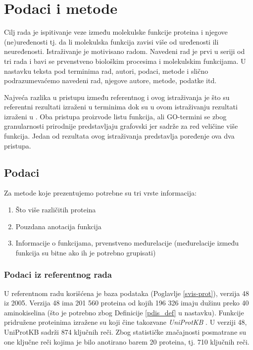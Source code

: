 
\chapter{Podaci i metode} %

\label{Podaci i metode} %

Cilj rada je ispitivanje veze između molekulske funkcije proteina i njegove\\ 
(ne)uređenosti tj. da li molekulska funkcija zavisi više od uređenosti ili
neuređenosti. Istraživanje je motivisano radom\parencite{Xie2007}. Navedeni rad
je prvi u seriji od tri rada i bavi se prvenstveno biološkim procesima i
molekulskim funkcijama.  U nastavku teksta pod terminima 
rad, autori, podaci, metode i slično podrazumevaćemo navedeni rad, njegove
autore, metode, podatke itd.

Najveća razlika u pristupu između referentnog i ovog istraživanja je što su
referentni rezultati izraženi u terminima  dok su u ovom
istraživanju rezultati izraženi u . Oba pristupa
proizvode listu funkcija, ali GO-termini se zbog granularnosti prirodnije
predstavljaju grafovski jer sadrže za red veličine više funkcija. Jedan od
rezultata ovog istraživanja predstavlja poređenje ova dva pristupa.


\section {Podaci}

Za metode koje prezentujemo potrebne su tri vrste informacija:
\begin{enumerate}
  \item Što više različitih proteina
  \item Pouzdana anotacija funkcija
  \item Informacije o funkcijama, prvenstveno međurelacije (međurelacije između\\ funkcija su bitne  ako ih je potrebno grupisati)
\end{enumerate}


\subsection{Podaci iz referentnog rada}

U referentnom radu \parencite{Xie2007} korišćena je  baza podataka 
\keyword{\swissprot} (Poglavlje \ref{svis-prot}), verzija 48 iz 2005.
Verzija 48 ima 201 560 proteina od kojih 196 326 imaju dužinu preko 40
aminokiselina (što je potrebno zbog Definicije \ref{pdis_def} u nastavku). Funkcije
pridružene proteinima izražene su 
 koji čine takozvane \textit{UniProtKB} 
. U verziji 48, UniProtKB sadrži 874 ključnih reči.  Zbog
statističke značajnosti posmatrane su one ključne reči kojima je bilo anotirano
barem 20 proteina, tj. 710 ključnih reči.

